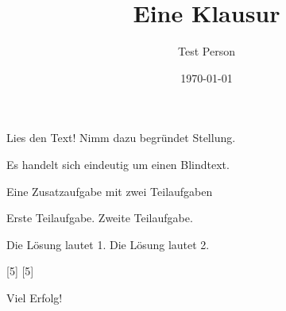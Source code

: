 \documentclass[a4paper]{scrartcl}
\author{Test Person}
\date{\today}
\title{Eine Klausur}
\begin{document}
\begin{aufgabe}
    \blindtext
    \begin{teilaufgaben}
        \teilaufgabe[5] Lies den Text!
        \teilaufgabe[10] Nimm dazu begründet Stellung.
    \end{teilaufgaben}
    \begin{loesung}
        Es handelt sich eindeutig um einen Blindtext.
    \end{loesung}
    \begin{erwartungen}
    \end{erwartungen}
\end{aufgabe}

\begin{aufgabe*}
    Eine Zusatzaufgabe mit zwei Teilaufgaben
    \begin{teilaufgaben}
        \teilaufgabe Erste Teilaufgabe.
        \teilaufgabe Zweite Teilaufgabe.
    \end{teilaufgaben}
    \begin{loesung*}
        \begin{teilaufgaben}
            \teilaufgabe Die Lösung lautet 1.
            \teilaufgabe Die Lösung lautet 2.
        \end{teilaufgaben}
    \end{loesung*}
    \begin{erwartungen}
        [5]
        [5]
    \end{erwartungen}
\end{aufgabe*}

\vspace{1cm}
{\Huge Viel Erfolg!}

\vfill
\punktuebersicht
\end{document}
